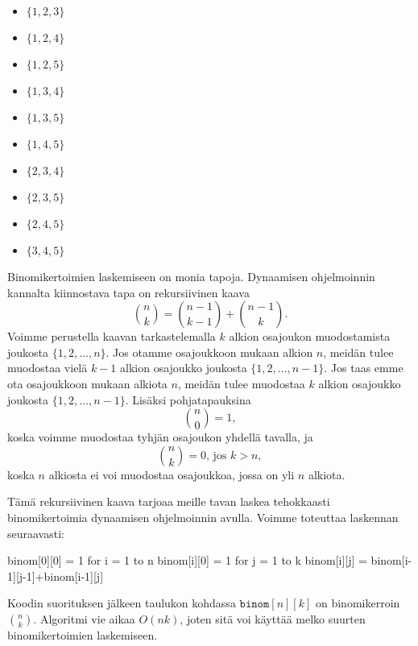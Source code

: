 \begin{multicols}{3}
\begin{itemize}
\item $\{1,2,3\}$
\item $\{1,2,4\}$
\item $\{1,2,5\}$
\item $\{1,3,4\}$
\item $\{1,3,5\}$
\item $\{1,4,5\}$
\item $\{2,3,4\}$
\item $\{2,3,5\}$
\item $\{2,4,5\}$
\item $\{3,4,5\}$
\end{itemize}
\end{multicols}

Binomikertoimien laskemiseen on monia tapoja.
Dynaamisen ohjelmoinnin kannalta kiinnostava tapa on rekursiivinen kaava
\[\binom{n}{k} = \binom{n-1}{k-1} + \binom{n-1}{k}.\]
Voimme perustella kaavan tarkastelemalla
$k$ alkion osajoukon muodostamista joukosta $\{1,2,\dots,n\}$.
Jos otamme osajoukkoon mukaan alkion $n$, meidän tulee muodostaa
vielä $k-1$ alkion osajoukko joukosta $\{1,2,\dots,n-1\}$.
Jos taas emme ota osajoukkoon mukaan alkiota $n$, meidän tulee muodostaa
$k$ alkion osajoukko joukosta $\{1,2,\dots,n-1\}$.
Lisäksi pohjatapauksina
\[ \binom{n}{0} = 1,\]
koska voimme muodostaa tyhjän osajoukon yhdellä tavalla, ja
\[ \binom{n}{k} = 0,\,\textrm{jos $k>n$},\]
koska $n$ alkiosta ei voi muodostaa osajoukkoa, jossa on yli $n$ alkiota.

Tämä rekursiivinen kaava tarjoaa meille tavan laskea tehokkaasti
binomikertoimia dynaamisen ohjelmoinnin avulla.
Voimme toteuttaa laskennan seuraavasti:

\begin{code}
binom[0][0] = 1
for i = 1 to n
    binom[i][0] = 1
    for j = 1 to k
        binom[i][j] = binom[i-1][j-1]+binom[i-1][j]
\end{code}

Koodin suorituksen jälkeen taulukon kohdassa
$\texttt{binom}[n][k]$ on binomikerroin $\binom{n}{k}$.
Algoritmi vie aikaa $O(nk)$, joten sitä voi käyttää
melko suurten binomikertoimien laskemiseen.